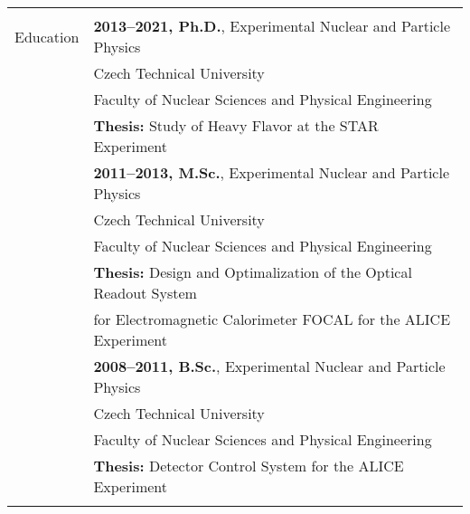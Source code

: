 \documentclass[a4paper,11pt,oneside]{article}
\begin{document}
\noindent \begin{tabular}{@{} l l}
\hline \\
 \Large{Education}   
     & \textbf{2013--2021, Ph.D.}, Experimental Nuclear and Particle Physics \\
     & {Czech Technical University} \\
     & {Faculty of Nuclear Sciences and Physical Engineering} \\
     & \textbf{Thesis:} Study of Heavy Flavor at the STAR Experiment \\[.2cm]
     & \textbf{2011--2013, M.Sc.}, Experimental Nuclear and Particle Physics \\
     & {Czech Technical University} \\
     & {Faculty of Nuclear Sciences and Physical Engineering} \\
     & \textbf{Thesis:} Design and Optimalization of the Optical Readout System \\
     & for Electromagnetic Calorimeter FOCAL for the ALICE Experiment \\[.2cm]
     & \textbf{2008--2011, B.Sc.}, Experimental Nuclear and Particle Physics \\
     & {Czech Technical University} \\
     & {Faculty of Nuclear Sciences and Physical Engineering} \\
     & \textbf{Thesis:} Detector Control System for the ALICE Experiment \\
     \\
   

\end{tabular}
\end{document}
